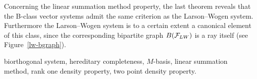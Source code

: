 \documentclass[12pt]{amsart}
\begin{document}
    \begin{remark}
      Concerning the linear summation method property, the last theorem reveals that the B-class vector systems
        admit the same criterion as the Larson--Wogen system.
      Furthermore the Larson--Wogen system is to a certain extent a canonical element of this class,
        since the corresponding bipartite graph $B(\cal{F}_{LW})$
        is a ray itself (see Figure~\ref{lw-bgraph}).
    \end{remark}
\bigskip

\vspace{1em}
 biorthogonal system, hereditary completeness, $M$-basis, linear summation method, rank one density property, two point density property.
\end{document}
